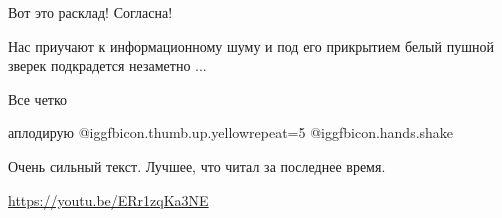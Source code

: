 \begin{itemize}
Вот это расклад! Согласна!

Нас приучают к информационному шуму и под его прикрытием белый пушной зверек подкрадется незаметно ...

Все четко

аплодирую @igg{fbicon.thumb.up.yellow}{repeat=5}  @igg{fbicon.hands.shake} 

Очень сильный текст. Лучшее, что читал за последнее время.

\url{https://youtu.be/ERr1zqKa3NE}

\end{itemize} %
